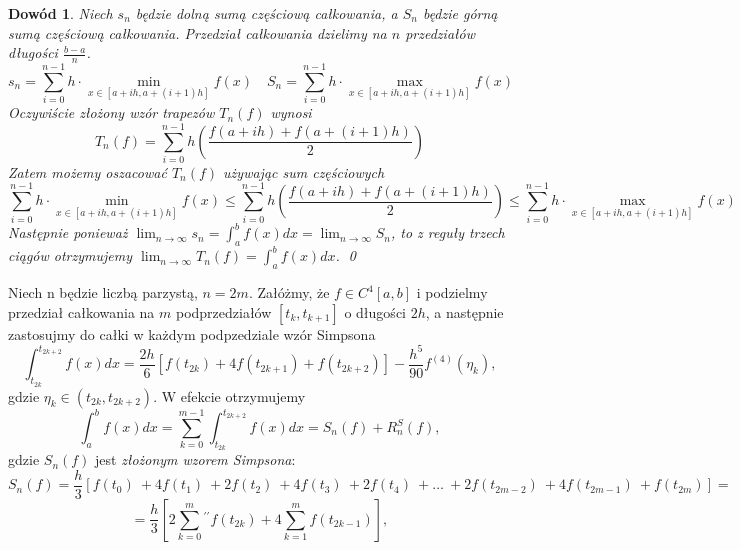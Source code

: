 \documentclass{article}
\newtheorem*{dd}{Dowód}
\begin{document}
\begin{dd}
	\normalfont
	Niech $s_n$ będzie dolną sumą częściową całkowania, a $S_n$ będzie górną sumą częściową całkowania. Przedział całkowania dzielimy na $n$ przedziałów długości
	$\frac{b - a}{n}$.
	\begin{equation*}
		s_n = \sum_{i = 0}^{n - 1} h \cdot \min_{x \in [a + ih, a + (i+1)h]} f(x) \quad S_n = \sum_{i = 0}^{n - 1} h \cdot \max_{x \in [a + ih, a + (i + 1)h]} f(x)
	\end{equation*}
	Oczywiście złożony wzór trapezów $T_n(f)$ wynosi
	\begin{equation*}
		T_n(f) = \sum_{i = 0}^{n - 1} h \left( \frac{f(a + ih) + f(a + (i + 1)h)}{2}\right)
	\end{equation*}
	Zatem możemy oszacować $T_n(f)$ używając sum częściowych
	\begin{equation*}
		\sum_{i = 0}^{n - 1} h \cdot \min_{x \in [a + ih, a + (i+1)h]} f(x) \leq \sum_{i = 0}^{n - 1} h \left( \frac{f(a + ih) + f(a + (i + 1)h)}{2}\right) \leq \sum_{i = 0}^{n - 1} h \cdot \max_{x \in [a + ih, a + (i + 1)h]} f(x)
	\end{equation*}
	Następnie ponieważ $\lim_{n \to \infty} s_n = \int_a^b f(x) dx = \lim_{n \to \infty} S_n$, to z reguły trzech ciągów otrzymujemy
	$\lim_{n \to \infty} T_n(f) = \int_a^b f(x) dx$.
	\qed
\end{dd}
Niech n będzie liczbą parzystą, $n = 2m$. Załóżmy, że $f \in C^4[a,b]$ i podzielmy przedział całkowania
na $m$ podprzedziałów $[t_k, t_{k + 1}]$ o długości $2h$, a następnie zastosujmy do całki w każdym
podpzedziale wzór Simpsona
\begin{equation*}
	\int_{t_{2k}}^{t_{2k + 2}} f(x) dx = \frac{2h}{6}[f(t_{2k}) + 4 f(t_{2k + 1}) + f(t_{2k + 2})] - \frac{h^5}{90} f^{(4)} (\eta_k),
\end{equation*}
gdzie $\eta_k \in (t_{2k}, t_{2k + 2})$. W efekcie otrzymujemy
\begin{equation*}
	\int_a^b f(x) dx = \sum_{k = 0}^{m - 1} \int_{t_{2k}}^{t_{2k + 2}} f(x) dx = S_n(f) + R_n^S(f),
\end{equation*}
gdzie $S_n(f)$ jest \emph{złożonym wzorem Simpsona}:
\begin{equation*}
	S_n(f) = \frac{h}{3}[f(t_0)\ + 4 f(t_1)\ + 2f(t_2)\ + 4f(t_3)\ + 2f(t_4)\ + \ldots\ + 2f(t_{2m - 2})\ + 4f(t_{2m - 1})\ + f(t_{2m})] =
\end{equation*}
\begin{equation*}
	= \frac{h}{3}[2 \sum_{k = 0}^m {}^{\prime\prime} f(t_{2k}) + 4 \sum_{k = 1}^m f(t_{2k - 1})],
\end{equation*}
\end{document}

